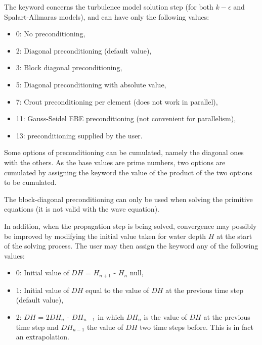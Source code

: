 The keyword  concerns
the turbulence model solution step (for both $k-\epsilon$ and Spalart-Allmaras
models), and can have only the following values:

\begin{itemize}
\item 0: No preconditioning,

\item 2: Diagonal preconditioning (default value),

\item 3: Block diagonal preconditioning,

\item 5: Diagonal preconditioning with absolute value,

\item 7: Crout preconditioning per element (does not work in parallel),

\item 11: Gauss-Seidel EBE preconditioning
(not convenient for parallelism),

\item 13: preconditioning supplied by the user.
\end{itemize}

Some options of preconditioning can be cumulated,
namely the diagonal ones with the others.
As the base values are prime numbers, two options are cumulated by assigning
the keyword the value of the product of the two options to be cumulated.

The block-diagonal preconditioning can only be used
when solving the primitive equations (it is not valid with the wave equation).

In addition, when the propagation step is being solved,
convergence may possibly be improved by modifying the initial value taken
for water depth $H$ at the start of the solving process.
The user may then assign the keyword 
any of the following values:

\begin{itemize}
\item 0: Initial value of $DH$ = $H_{n+1}$ - $H_n$ null,

\item 1: Initial value of $DH$ equal to the value of $DH$
at the previous time step (default value),

\item 2: $DH$ = 2$DH_n$ - $DH_{n-1}$ in which $DH_n$ is the value of
$DH$ at the previous time step and $DH_{n-1}$ the value of $DH$ two time steps
before.
This is in fact an extrapolation.
\end{itemize}

